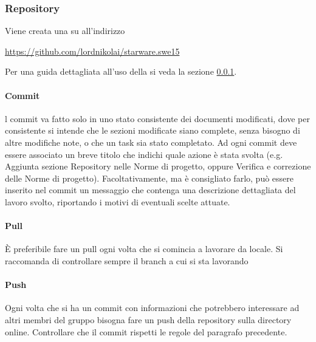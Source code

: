 \documentclass[12pt,a4paper]{article}
\begin{document}
\subsubsection{Repository} \label{sec:rep} %
Viene creata una  su  all'indirizzo 
\begin{center}
	\url{https://github.com/lordnikolai/starware.swe15}
\end{center}
Per una guida dettagliata all'uso della  si veda la sezione \ref{sec:rep}.

\paragraph{Commit}
l commit va fatto solo in uno stato consistente dei documenti modificati, dove per consistente si intende che le sezioni modificate siano complete, senza bisogno di altre modifiche note, o che un task sia stato completato. Ad ogni commit deve essere associato un breve titolo che indichi quale azione è stata svolta (e.g. Aggiunta sezione Repository nelle Norme di progetto, oppure Verifica e correzione delle Norme di progetto). Facoltativamente, ma è consigliato farlo, può essere inserito nel commit un messaggio che contenga una descrizione dettagliata del lavoro svolto, riportando i motivi di eventuali scelte attuate.
\paragraph{Pull}
È preferibile fare un pull ogni volta che si comincia a lavorare da locale. Si raccomanda di controllare sempre il branch a cui si sta lavorando
\paragraph{Push}
Ogni volta che si ha un commit con informazioni che potrebbero interessare ad altri membri del gruppo bisogna fare un push della repository sulla directory online. Controllare che il commit rispetti le regole del paragrafo precedente.
\end{document}
